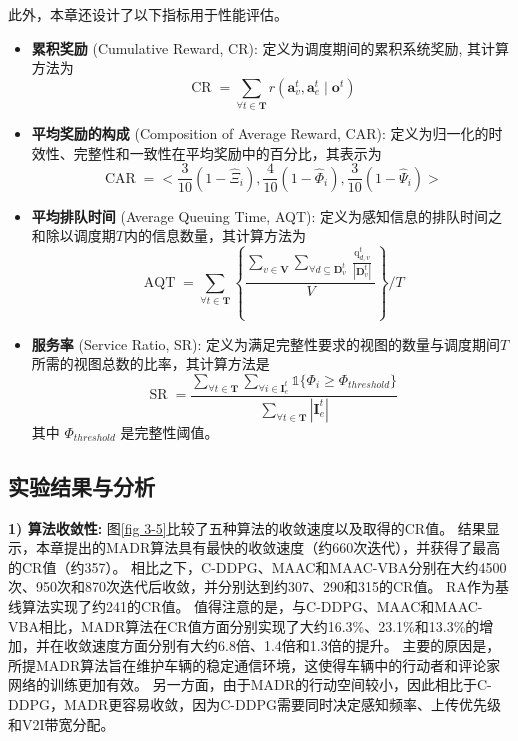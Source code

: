 此外，本章还设计了以下指标用于性能评估。
\begin{itemize}
	\item \textbf{累积奖励} (Cumulative Reward, CR): 定义为调度期间的累积系统奖励, 其计算方法为
		\begin{equation}
			\operatorname{CR} = \sum_{\forall t \in \mathbf{T}} r\left(\boldsymbol{a}_{v}^{t},\boldsymbol{a}_{e}^{t} \mid \boldsymbol{o}^{t}\right)
		\end{equation}
	\item \textbf{平均奖励的构成} (Composition of Average Reward, CAR): 定义为归一化的时效性、完整性和一致性在平均奖励中的百分比，其表示为
		\begin{equation}
			\operatorname{CAR} = <\frac{3}{10}(1-\hat{\Xi}_{i}),\frac{4}{10}(1-\hat{\Phi}_{i}), \frac{3}{10}(1-\hat{\Psi}_{i})>
		\end{equation}
	\item \textbf{平均排队时间} (Average Queuing Time, AQT): 定义为感知信息的排队时间之和除以调度期$T$内的信息数量，其计算方法为 
		\begin{equation}
			\operatorname{AQT} =\sum_{\forall t \in \mathbf{T}} \left \{ \frac{\sum_{v \in \mathbf{V}} \sum_{\forall d \subseteq \mathbf{D}_{v}^t} \frac{\operatorname{q}_{d, v}^t}{|\mathbf{D}_{v}^t|} }{V} \right\} \bigg/ T
		\end{equation}
	\item \textbf{服务率} (Service Ratio, SR): 定义为满足完整性要求的视图的数量与调度期间$T$所需的视图总数的比率，其计算方法是 
		\begin{equation}
			\operatorname{SR} = \frac{\sum_{\forall t \in \mathbf{T}}\sum_{\forall i \in \mathbf{I}_e^t} \mathds{1}\{\Phi_{i} \geq \Phi_{threshold}\}}{ \sum_{\forall t \in \mathbf{T}} |\mathbf{I}_e^t|}
		\end{equation}
	其中 $\Phi_{threshold}$ 是完整性阈值。
\end{itemize}

\subsection{实验结果与分析}

\textbf{1) 算法收敛性:}
图\ref{fig 3-5}比较了五种算法的收敛速度以及取得的CR值。
结果显示，本章提出的MADR算法具有最快的收敛速度（约660次迭代），并获得了最高的CR值（约357）。
相比之下，C-DDPG、MAAC和MAAC-VBA分别在大约4500次、950次和870次迭代后收敛，并分别达到约307、290和315的CR值。
RA作为基线算法实现了约241的CR值。
值得注意的是，与C-DDPG、MAAC和MAAC-VBA相比，MADR算法在CR值方面分别实现了大约16.3\%、23.1\%和13.3\%的增加，并在收敛速度方面分别有大约6.8倍、1.4倍和1.3倍的提升。
主要的原因是，所提MADR算法旨在维护车辆的稳定通信环境，这使得车辆中的行动者和评论家网络的训练更加有效。
另一方面，由于MADR的行动空间较小，因此相比于C-DDPG，MADR更容易收敛，因为C-DDPG需要同时决定感知频率、上传优先级和V2I带宽分配。

